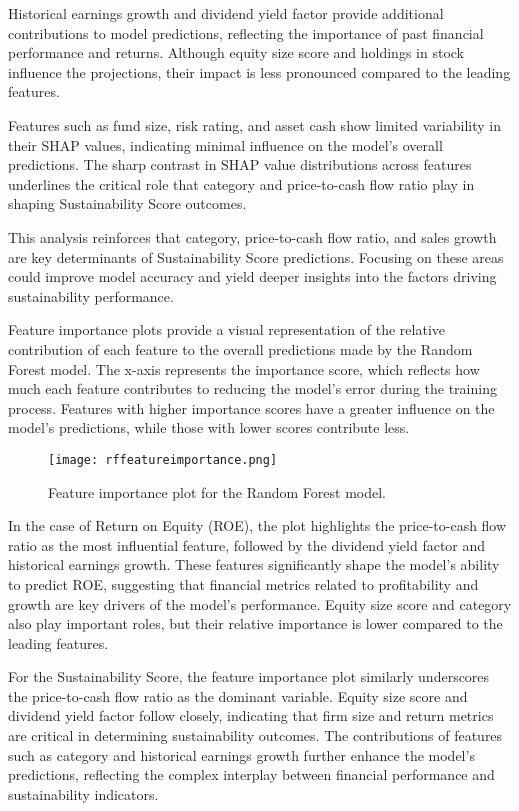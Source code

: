 Historical earnings growth and dividend yield factor provide additional contributions to model predictions, reflecting the importance of past financial performance and returns. Although equity size score and holdings in stock influence the projections, their impact is less pronounced compared to the leading features.

Features such as fund size, risk rating, and asset cash show limited variability in their SHAP values, indicating minimal influence on the model's overall predictions. The sharp contrast in SHAP value distributions across features underlines the critical role that category and price-to-cash flow ratio play in shaping Sustainability Score outcomes.

This analysis reinforces that category, price-to-cash flow ratio, and sales growth are key determinants of Sustainability Score predictions. Focusing on these areas could improve model accuracy and yield deeper insights into the factors driving sustainability performance.

Feature importance plots provide a visual representation of the relative contribution of each feature to the overall predictions made by the Random Forest model. The x-axis represents the importance score, which reflects how much each feature contributes to reducing the model's error during the training process. Features with higher importance scores have a greater influence on the model's predictions, while those with lower scores contribute less.

\begin{figure}[h!]
    \centering
    \texttt{[image: rffeatureimportance.png]}
    \caption{Feature importance plot for the Random Forest model.}
\end{figure}

In the case of Return on Equity (ROE), the plot highlights the price-to-cash flow ratio as the most influential feature, followed by the dividend yield factor and historical earnings growth. These features significantly shape the model's ability to predict ROE, suggesting that financial metrics related to profitability and growth are key drivers of the model's performance. Equity size score and category also play important roles, but their relative importance is lower compared to the leading features.

For the Sustainability Score, the feature importance plot similarly underscores the price-to-cash flow ratio as the dominant variable. Equity size score and dividend yield factor follow closely, indicating that firm size and return metrics are critical in determining sustainability outcomes. The contributions of features such as category and historical earnings growth further enhance the model's predictions, reflecting the complex interplay between financial performance and sustainability indicators.

